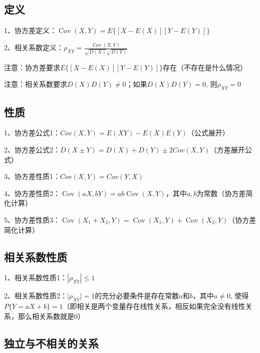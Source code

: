 \subsection{定义}

1、协方差定义：$\operatorname{Cov}(X, Y)=E\{[X-E(X)][Y-E(Y)]\}$

2、相关系数定义：$\rho_{X Y}=\frac{\operatorname{Cov}(X, Y)}{\sqrt{D(X)} \sqrt{D(Y)}}$

注意：协方差要求$E\{[X-E(X)][Y-E(Y)]\}$存在（不存在是什么情况）

注意：相关系数要求$D(X) D(Y) \neq 0$；如果$D(X) D(Y)=0$, 则$\rho_{X Y}=0$



\subsection{性质}

1、协方差公式1：$C o v ( X , Y ) = E ( X Y ) - E ( X ) E ( Y ) $（公式展开）

2、协方差公式2：$D ( X \pm Y ) = D ( X ) + D ( Y ) \pm 2 Cov ( X , Y )  $（方差展开公式）

3、协方差性质1：$Cov(X, Y)=Cov(Y, X)$

4、协方差性质2：$\operatorname{Cov}(a X, b Y)=a b \operatorname{Cov}(X, Y)$，其中$a,b$为常数（协方差简化计算）

5、协方差性质3：$\operatorname{Cov}\left(X_{1}+X_{2}, Y\right)=\operatorname{Cov}\left(X_{1}, Y\right)+\operatorname{Cov}\left(X_{2}, Y\right)$（协方差简化计算）



\subsection{相关系数性质}

1、相关系数性质1：$\left|\rho_{X Y}\right| \leqslant 1$

2、相关系数性质2：$\mid \rho_{X Y} \mid=1$的充分必要条件是存在常数$a$和$b$，其中$a \neq 0$, 使得$P\{Y=a X+b\}=1$（即相关是两个变量存在线性关系，相反如果完全没有线性关系，那么相关系数就是0）



\subsection{独立与不相关的关系}

